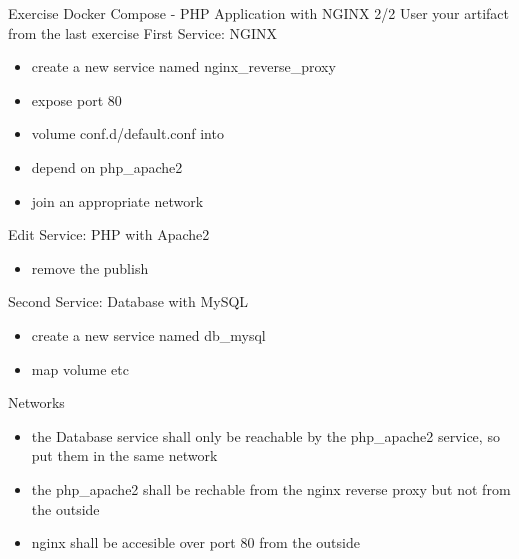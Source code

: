 \documentclass[10pt,aspectratio=\ratio,
compress
]{beamer}
\begin{document}
\begin{frame}{Exercise Docker Compose - PHP Application with NGINX 2/2}
User your artifact from the last exercise
First Service: NGINX
\begin{itemize}
	\item create a new service named nginx\_reverse\_proxy
	\item expose port 80
	\item volume conf.d/default.conf into
	\item depend on php\_apache2
	\item join an appropriate network
\end{itemize}
Edit Service: PHP with Apache2
\begin{itemize}
	\item remove the publish
\end{itemize}
Second Service: Database with MySQL
\begin{itemize}
	\item create a new service named db\_mysql
	\item map volume etc
\end{itemize}
Networks
\begin{itemize}
	\item the Database service shall only be reachable by the php\_apache2 service, so put them in the same network
	\item the php\_apache2 shall be rechable from the nginx reverse proxy but not from the outside
	\item nginx shall be accesible over port 80 from the outside
\end{itemize}
\end{frame}
\end{document}
